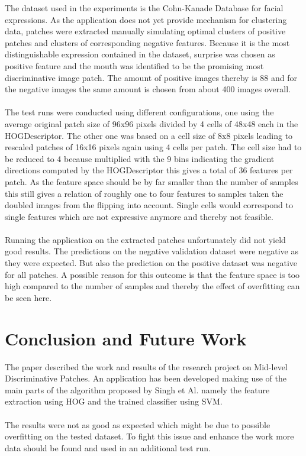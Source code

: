 \documentclass[%
   final,      %
   paper=a4,%
   paper=portrait, %
   pagesize=auto, %
   fontsize=10pt,%
   version=last, %
 ]{scrartcl} %
\begin{document}
The dataset used in the experiments is the Cohn-Kanade Database for facial expressions.\cite[Kanade2000]{Kanade2000CK+}\cite[Lucey2010]{Lucey2010CK+} As the application does not yet provide mechanism for clustering data, patches were extracted manually simulating optimal clusters of positive patches and clusters of corresponding negative features. Because it is the most distinguishable expression contained in the dataset, surprise was chosen as positive feature and the mouth was identified to be the promising most discriminative image patch. The amount of positive images thereby is 88 and for the negative images the same amount is chosen from about 400 images overall.
\\
\\
The test runs were conducted using different configurations, one using the average original patch size of 96x96 pixels divided by 4 cells of 48x48 each in the HOGDescriptor. The other one was based on a cell size of 8x8 pixels leading to rescaled patches of 16x16 pixels again using 4 cells per patch. The cell size had to be reduced to 4 because multiplied with the 9 bins indicating the gradient directions computed by the HOGDescriptor this gives a total of 36 features per patch. As the feature space should be by far smaller than the number of samples this still gives a relation of roughly one to four features to samples taken the doubled images from the flipping into account. Single cells would correspond to single features which are not expressive anymore and thereby not feasible.
\\
\\
Running the application on the extracted patches unfortunately did not yield good results. The predictions on the negative validation dataset were negative as they were expected. But also the prediction on the positive dataset was negative for all patches. A possible reason for this outcome is that the feature space is too high compared to the number of samples and thereby the effect of overfitting can be seen here.

\section{Conclusion and Future Work}

The paper described the work and results of the research project on Mid-level Discriminative Patches. An application has been developed making use of the main parts of the algorithm proposed by Singh et Al. namely the feature extraction using HOG and the trained classifier using SVM.
\\
\\
The results were not as good as expected which might be due to possible overfitting on the tested dataset. To fight this issue and enhance the work more data should be found and used in an additional test run.


%



\end{document}
